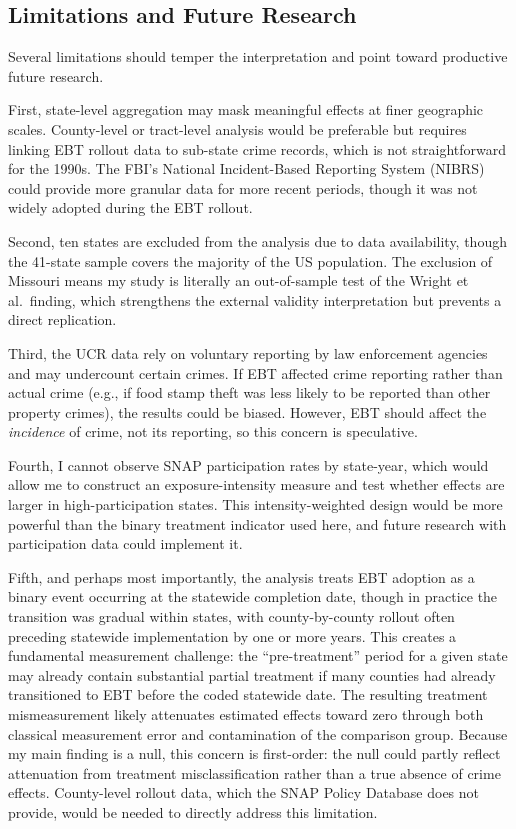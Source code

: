 \documentclass[12pt]{article}
\begin{document}
\subsection{Limitations and Future Research}

Several limitations should temper the interpretation and point toward productive future research.

First, state-level aggregation may mask meaningful effects at finer geographic scales. County-level or tract-level analysis would be preferable but requires linking EBT rollout data to sub-state crime records, which is not straightforward for the 1990s. The FBI's National Incident-Based Reporting System (NIBRS) could provide more granular data for more recent periods, though it was not widely adopted during the EBT rollout.

Second, ten states are excluded from the analysis due to data availability, though the 41-state sample covers the majority of the US population. The exclusion of Missouri means my study is literally an out-of-sample test of the Wright et al.\ finding, which strengthens the external validity interpretation but prevents a direct replication.

Third, the UCR data rely on voluntary reporting by law enforcement agencies and may undercount certain crimes. If EBT affected crime reporting rather than actual crime (e.g., if food stamp theft was less likely to be reported than other property crimes), the results could be biased. However, EBT should affect the \textit{incidence} of crime, not its reporting, so this concern is speculative.

Fourth, I cannot observe SNAP participation rates by state-year, which would allow me to construct an exposure-intensity measure and test whether effects are larger in high-participation states. This intensity-weighted design would be more powerful than the binary treatment indicator used here, and future research with participation data could implement it.

Fifth, and perhaps most importantly, the analysis treats EBT adoption as a binary event occurring at the statewide completion date, though in practice the transition was gradual within states, with county-by-county rollout often preceding statewide implementation by one or more years. This creates a fundamental measurement challenge: the ``pre-treatment'' period for a given state may already contain substantial partial treatment if many counties had already transitioned to EBT before the coded statewide date. The resulting treatment mismeasurement likely attenuates estimated effects toward zero through both classical measurement error and contamination of the comparison group. Because my main finding is a null, this concern is first-order: the null could partly reflect attenuation from treatment misclassification rather than a true absence of crime effects. County-level rollout data, which the SNAP Policy Database does not provide, would be needed to directly address this limitation.
\end{document}
